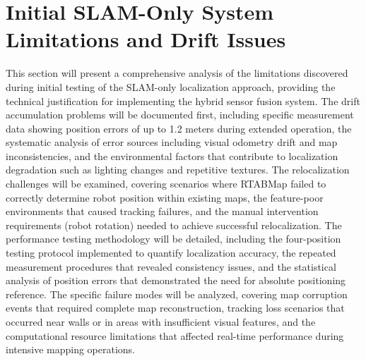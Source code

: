 \section{Initial SLAM-Only System Limitations and Drift Issues}
This section will present a comprehensive analysis of the limitations discovered during initial testing of the SLAM-only localization approach, providing the technical justification for implementing the hybrid sensor fusion system. The drift accumulation problems will be documented first, including specific measurement data showing position errors of up to 1.2 meters during extended operation, the systematic analysis of error sources including visual odometry drift and map inconsistencies, and the environmental factors that contribute to localization degradation such as lighting changes and repetitive textures. The relocalization challenges will be examined, covering scenarios where RTABMap failed to correctly determine robot position within existing maps, the feature-poor environments that caused tracking failures, and the manual intervention requirements (robot rotation) needed to achieve successful relocalization. The performance testing methodology will be detailed, including the four-position testing protocol implemented to quantify localization accuracy, the repeated measurement procedures that revealed consistency issues, and the statistical analysis of position errors that demonstrated the need for absolute positioning reference. The specific failure modes will be analyzed, covering map corruption events that required complete map reconstruction, tracking loss scenarios that occurred near walls or in areas with insufficient visual features, and the computational resource limitations that affected real-time performance during intensive mapping operations.

